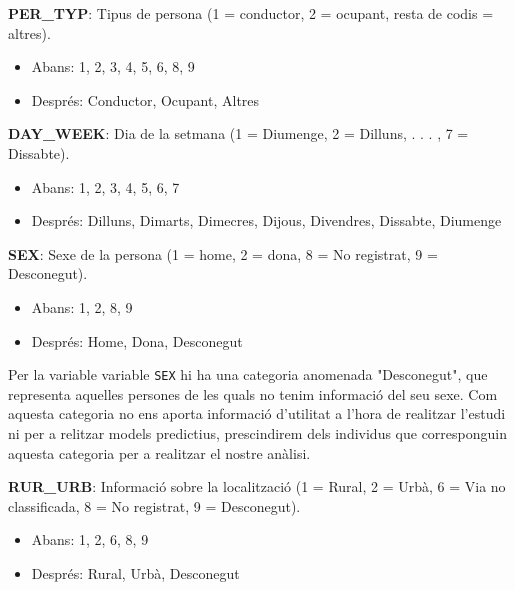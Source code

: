\documentclass[12pt,longbibliography]{article}
\theoremstyle{definition}
\theoremstyle{remark}
\begin{document}
\textbf{PER\_TYP}: Tipus de persona (1 = conductor, 2 = ocupant, resta de codis = altres).

\begin{itemize}

\item Abans: 1, 2, 3, 4, 5, 6, 8, 9

\item Després: Conductor, Ocupant, Altres

\end{itemize}


\textbf{DAY\_WEEK}: Dia de la setmana (1 = Diumenge, 2 = Dilluns, . . . , 7 = Dissabte).

\begin{itemize}

\item Abans: 1, 2, 3, 4, 5, 6, 7

\item Després: Dilluns, Dimarts, Dimecres, Dijous, Divendres, Dissabte, Diumenge

\end{itemize}

\textbf{SEX}: Sexe de la persona (1 = home, 2 = dona, 8 = No registrat, 9 = Desconegut).

\begin{itemize}

\item Abans: 1, 2, 8, 9

\item Després: Home, Dona, Desconegut

\end{itemize}

Per la variable variable \texttt{SEX} hi ha una categoria anomenada "Desconegut", que representa aquelles persones de les quals no tenim informació del seu sexe. Com aquesta categoria no ens aporta informació d'utilitat a l'hora de realitzar l'estudi ni per a relitzar models predictius, prescindirem dels individus que corresponguin aquesta categoria per a realitzar el nostre anàlisi.

\textbf{RUR\_URB}: Informació sobre la localització (1 = Rural, 2 = Urbà, 6 = Via no classificada, 8 = No registrat, 9 = Desconegut). 

\begin{itemize}

\item Abans: 1, 2, 6, 8, 9

\item Després: Rural, Urbà, Desconegut

\end{itemize}
\end{document}
